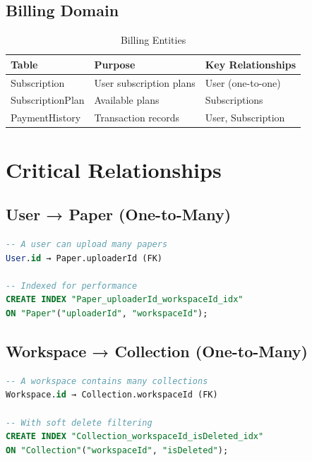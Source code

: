 \subsection{Billing Domain}

\begin{table}[H]
\centering
\caption{Billing Entities}
\label{tab:erd-billing-domain}
\begin{tabular}{@{}llp{6cm}@{}}
\toprule
\textbf{Table} & \textbf{Purpose} & \textbf{Key Relationships} \\
\midrule
Subscription & User subscription plans & User (one-to-one) \\
SubscriptionPlan & Available plans & Subscriptions \\
PaymentHistory & Transaction records & User, Subscription \\
\bottomrule
\end{tabular}
\end{table}

\section{Critical Relationships}
\label{sec:erd-relationships}

\subsection{User → Paper (One-to-Many)}

\begin{lstlisting}[language=SQL, caption={User-Paper Relationship}]
-- A user can upload many papers
User.id → Paper.uploaderId (FK)

-- Indexed for performance
CREATE INDEX "Paper_uploaderId_workspaceId_idx" 
ON "Paper"("uploaderId", "workspaceId");
\end{lstlisting}

\subsection{Workspace → Collection (One-to-Many)}

\begin{lstlisting}[language=SQL, caption={Workspace-Collection Relationship}]
-- A workspace contains many collections
Workspace.id → Collection.workspaceId (FK)

-- With soft delete filtering
CREATE INDEX "Collection_workspaceId_isDeleted_idx" 
ON "Collection"("workspaceId", "isDeleted");
\end{lstlisting}


